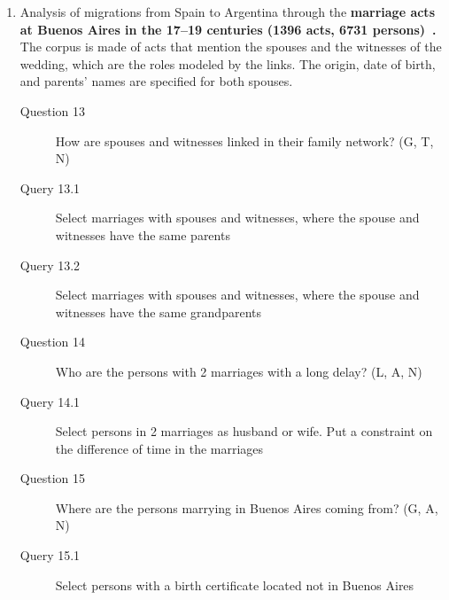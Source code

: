\begin{enumerate}
    \item Analysis of migrations from Spain to Argentina through the \textbf{marriage acts at Buenos Aires in the 17--19 centuries (1396 acts, 6731 persons)~\cite{moutoukiasBuenosAiresPort2016}.}
    The corpus is made of acts that mention the spouses and the witnesses of the wedding, which are the roles modeled by the links. The origin, date of birth, and parents' names are specified for both spouses.
    \begin{footnotesize}
    \begin{description}
    \item[Question 13] How are spouses and witnesses linked in their family network? (G, T, N)
    \item[\myindent Query 13.1] Select marriages with spouses and witnesses, where the spouse and witnesses have the same parents
    \item[\myindent Query 13.2] Select marriages with spouses and witnesses, where the spouse and witnesses have the same grandparents
    \item[Question 14] Who are the persons with 2 marriages with a long delay? (L, A, N)
    \item[\myindent Query 14.1] Select persons in 2 marriages as husband or wife. Put a constraint on the difference of time in the marriages
    \item[Question 15] Where are the persons marrying in Buenos Aires coming from? (G, A, N)
    \item[\myindent Query 15.1] Select persons with a birth certificate located not in Buenos Aires
    \end{description}
    \end{footnotesize}


\end{enumerate}
